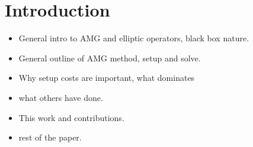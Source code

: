 \section{Introduction}
\label{sec:intro}


\begin{itemize}
  \item General intro to AMG and elliptic operators, black box nature.
  \item General outline of AMG method, setup and solve.
  \item Why setup costs are important, what dominates
  \item what others have done.
  \item This work and contributions.
  \item rest of the paper.
\end{itemize}
